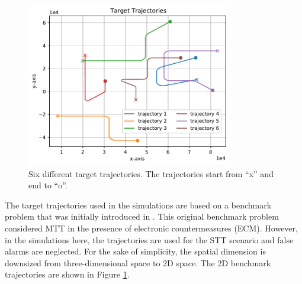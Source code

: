 \documentclass[english, 12pt, a4paper, elec, utf8, a-1b, online]{aaltothesis}
\begin{document}
\begin{figure}
    \centering
    \includegraphics[width=0.8\textwidth]{figures/benchmark/trajectories.pdf}
    \caption{Six different target trajectories. The trajectories start from ``x'' and end to ``o''.}
    \label{fig:benchmark_trajectories}
\end{figure}

The target trajectories used in the simulations are based on a benchmark problem that was initially introduced in \cite{Blair1998}.
This original benchmark problem considered MTT in the presence of electronic countermeasures (ECM).
However, in the simulations here, the trajectories are used for the STT scenario and false alarms are neglected.
For the sake of simplicity, the spatial dimension is downsized from three-dimensional space to 2D space.
The 2D benchmark trajectories are shown in Figure \ref{fig:benchmark_trajectories}.
\end{document}
